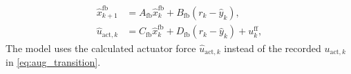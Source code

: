 %
\begin{equation}
\begin{aligned}
 \hat x^{\mathrm{fb}}_{k+1}&=A_{\mathrm{fb}}\hat x^{\mathrm{fb}}_k+B_{\mathrm{fb}}(r_k-\hat y_k),\\
 \hat u_{\mathrm{act},k}&=C_{\mathrm{fb}}\hat x^{\mathrm{fb}}_k+D_{\mathrm{fb}}(r_k-\hat y_k)+u^{\mathrm{ff}}_k,
\end{aligned}
\label{eq:aug_two_loops}
\end{equation}
%
The model uses the calculated actuator force $\hat u_{\mathrm{act},k}$
instead of the recorded $u_{\mathrm{act},k}$
in \eqref{eq:aug_transition}.

